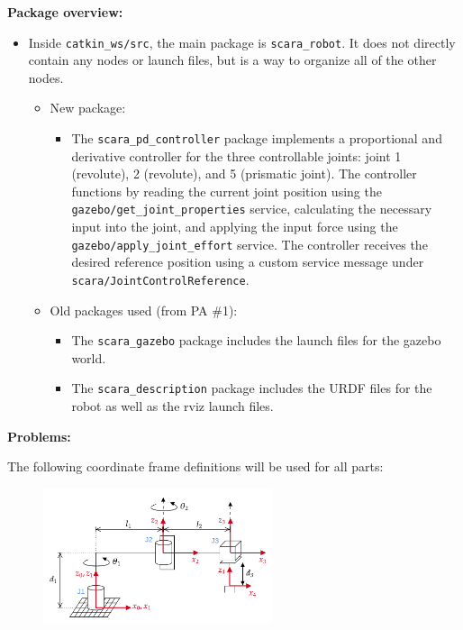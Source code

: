 \documentclass[10pt]{article}
\begin{document}
\setlength{\abovedisplayskip}{6pt}
\setlength{\belowdisplayskip}{3pt}
\setlength{\abovedisplayshortskip}{4pt}
\setlength{\belowdisplayshortskip}{4pt}

\textbf{Package overview:}
\begin{itemize}
	\item Inside \texttt{catkin\_ws/src}, the main package is \texttt{scara\_robot}. It does not directly contain any nodes or launch files, but is a way to organize all of the other nodes.
	\begin{itemize}
		\item New package:
		\begin{itemize}
			\item The \texttt{scara\_pd\_controller} package implements a proportional and derivative controller for the three controllable joints: joint 1 (revolute), 2 (revolute), and 5 (prismatic joint). The controller functions by reading the current joint position using the \\ \texttt{gazebo/get\_joint\_properties} service, calculating the necessary input into the joint, and applying the input force using the \texttt{gazebo/apply\_joint\_effort} service. The controller receives the desired reference position using a custom service message under \texttt{scara/JointControlReference}.
		\end{itemize}
		
		\item Old packages used (from PA \#1):
		\begin{itemize}
			\item The \texttt{scara\_gazebo} package includes the launch files for the gazebo world.
			\item The \texttt{scara\_description} package includes the URDF files for the robot as well as the rviz launch files.
		\end{itemize}
	\end{itemize}
\end{itemize}
\vspace{0.5cm}

\textbf{Problems:}

The following coordinate frame definitions will be used for all parts:

\begin{figure}[H]
	\centering
	\includegraphics[width=0.6\textwidth]{figures/rrp_manipulator_reference_frames.png}
\end{figure}
\end{document}

